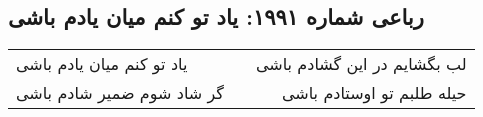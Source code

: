 \begin{center}
\section*{رباعی شماره ۱۹۹۱: یاد تو کنم میان یادم باشی}
\label{sec:1991}
\begin{longtable}{l p{0.5cm} r}
یاد تو کنم میان یادم باشی
&&
لب بگشایم در این گشادم باشی
\\
گر شاد شوم ضمیر شادم باشی
&&
حیله طلبم تو اوستادم باشی
\\
\end{longtable}
\end{center}
